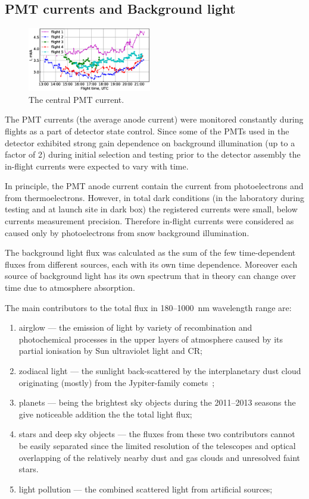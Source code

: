 \documentclass[final,5p,times,twocolumn]{elsarticle}
\begin{document}
\subsection{PMT currents and Background light}

\begin{figure}[tb]
    \includegraphics[width=0.48\textwidth]{figs/cur2013_PMT1.eps}
    \caption{The central PMT current.}
\label{fig:current}
\end{figure}

The PMT currents (the average anode current) were monitored constantly during flights as a part of detector state control. Since some of the PMTs used in the detector exhibited strong gain dependence on background illumination (up to a factor of 2) during initial selection and testing prior to the detector assembly the in-flight currents were expected to vary with time.

In principle, the PMT anode current contain the current from photoelectrons and from thermoelectrons. However, in total dark conditions (in the laboratory during testing and at launch site in dark box) the registered currents were small, below currents measurement precision. Therefore in-flight currents were considered as caused only by photoelectrons from snow background illumination.

The background light flux was calculated as the sum of the few time-dependent fluxes from different sources, each with its own time dependence. Moreover each source of background light has its own spectrum that in theory can change over time due to atmosphere absorption.

The main contributors to the total flux in 180--1000~nm wavelength range are:
\begin{enumerate}
    \item airglow --- the emission of light by variety of recombination and photochemical processes in the upper layers of atmosphere caused by its partial ionisation by Sun ultraviolet light and CR;
    \item zodiacal light --- the sunlight back-scattered by the interplanetary dust cloud originating (mostly) from the Jypiter-family comets~\cite{Nesvorn__2010};
    \item planets --- being the brightest sky objects during the 2011--2013 seasons the give noticeable addition the the total light flux;
    \item stars and deep sky objects --- the fluxes from these two contributors cannot be easily separated since the limited resolution of the telescopes and optical overlapping of the relatively nearby dust and gas clouds and unresolved faint stars.
    \item light pollution --- the combined scattered light from artificial sources;
\end{enumerate}
\end{document}
